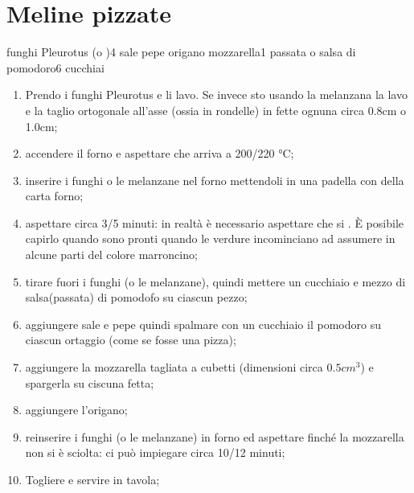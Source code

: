 \section{Meline pizzate}

\generalRecipeInfos{}

\ingredienti%
    {funghi Pleurotus (o )}{4}%
    {sale}{\qb{}}%
    {pepe}{\qb{}}%
    {origano}{\qb{}}%
    {mozzarella}{1}%
    {passata o salsa di pomodoro}{6 cucchiai}%


\begin{enumerate}
    \item Prendo i funghi Pleurotus e li lavo. Se invece sto usando la melanzana la lavo e la taglio ortogonale all'asse (ossia in rondelle) in fette ognuna circa 0.8cm o 1.0cm;

    \item accendere il forno e aspettare che arriva a 200/220 °C;
    \item inserire i funghi o le melanzane nel forno mettendoli in una padella con della carta forno;

    \item aspettare circa 3/5 minuti: in realtà è necessario aspettare che si . \`E posibile capirlo quando sono pronti quando le verdure incominciano ad assumere in alcune parti del colore marroncino;

    \item tirare fuori i funghi (o le melanzane), quindi mettere un cucchiaio e mezzo di salsa(passata) di pomodofo su ciascun pezzo;

    \item aggiungere sale e pepe quindi spalmare con un cucchiaio il pomodoro su ciascun ortaggio (come se fosse una pizza);

    \item aggiungere la mozzarella tagliata a cubetti (dimensioni circa $0.5cm^3$) e spargerla su ciscuna fetta;

    \item aggiungere l'origano;

    \item reinserire i funghi (o le melanzane) in forno ed aspettare finché la mozzarella non si è sciolta: ci può impiegare circa 10/12 minuti;

    \item Togliere e servire in tavola;
    
\end{enumerate}
